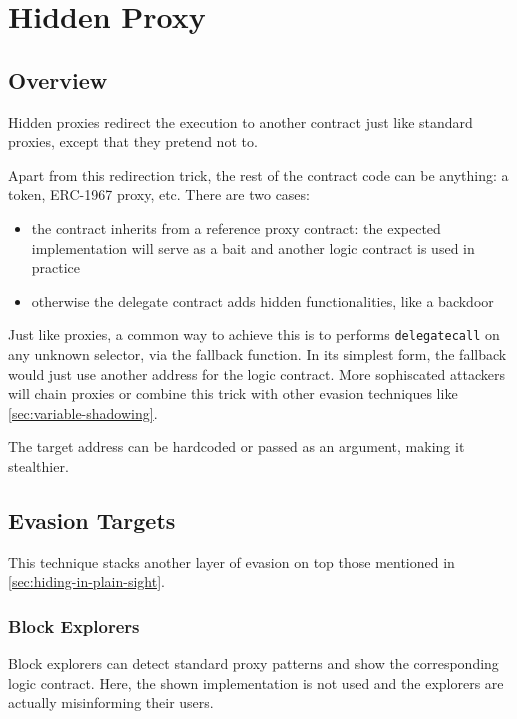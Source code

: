 \section{Hidden Proxy} \label{sec:hidden-proxy}

\subsection{Overview}

Hidden proxies redirect the execution to another contract just like standard proxies, except that they pretend not to.

Apart from this redirection trick, the rest of the contract code can be anything: a token, ERC-1967 proxy, etc.
There are two cases:

\begin{itemize}
\item{the contract inherits from a reference proxy contract: the expected implementation will serve as a bait and another logic contract is used in practice}
\item{otherwise the delegate contract adds hidden functionalities, like a backdoor}
\end{itemize}

Just like proxies, a common way to achieve this is to performs \lstinline{delegatecall} on any unknown selector, via the fallback function.
In its simplest form, the fallback would just use another address for the logic contract.
More sophiscated attackers will chain proxies or combine this trick with other evasion techniques like \ref{sec:variable-shadowing}.

The target address can be hardcoded or passed as an argument, making it stealthier.

\subsection{Evasion Targets}

This technique stacks another layer of evasion on top those mentioned in \ref{sec:hiding-in-plain-sight}.

\subsubsection{Block Explorers}

Block explorers can detect standard proxy patterns and show the corresponding logic contract.
Here, the shown implementation is not used and the explorers are actually misinforming their users.

